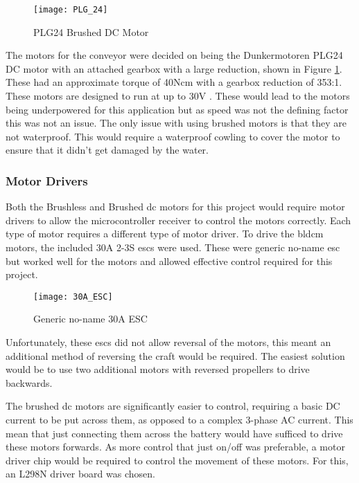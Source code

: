 \documentclass [12pt]{article}
\begin{document}
\begin{figure}[H]
\centerline{\texttt{[image: PLG\_24]}}
\caption{PLG24 Brushed DC Motor}
\label{fig:PLG_24}
\end{figure}

The motors for the conveyor were decided on being the Dunkermotoren PLG24 DC motor with an attached gearbox with a large reduction, shown in Figure \ref{fig:PLG_24}. These had an approximate torque of 40Ncm with a gearbox reduction of 353:1. These motors are designed to run at up to 30V \cite{PLG_24}. These would lead to the motors being underpowered for this application but as speed was not the defining factor this was not an issue. The only issue with using brushed motors is that they are not waterproof. This would require a waterproof cowling to cover the motor to ensure that it didn't get damaged by the water. 

\subsubsection{Motor Drivers}


Both the Brushless and Brushed \gls{dc} motors for this project would require motor drivers to allow the microcontroller receiver to control the motors correctly. Each type of motor requires a different type of motor driver. To drive the \gls{bldcm} motors, the included 30A 2-3S \gls{esc}s were used. These were generic no-name \gls{esc} but worked well for the motors and allowed effective control required for this project. 

\begin{figure}[H]
\centerline{\texttt{[image: 30A\_ESC]}}
\caption{Generic no-name 30A ESC}
\label{fig:30A_ESC}
\end{figure}

Unfortunately, these \gls{esc}s did not allow reversal of the motors, this meant an additional method of reversing the craft would be required. The easiest solution would be to use two additional motors with reversed propellers to drive backwards.

The brushed \gls{dc} motors are significantly easier to control, requiring a basic DC current to be put across them, as opposed to a complex 3-phase AC current. This mean that just connecting them across the battery would have sufficed to drive these motors forwards. As more control that just on/off was preferable, a motor driver chip would be required to control the movement of these motors. For this, an L298N driver board was chosen. 
\end{document}
